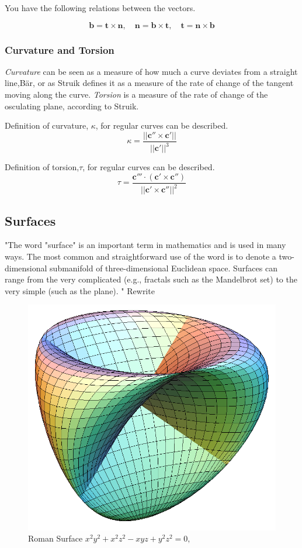 You have the following relations between the vectors.

\begin{equation}
\textbf{b} = \textbf{t} \times \textbf{n} ,\quad \textbf{n} = \textbf{b} \times \textbf{t} ,\quad \textbf{t} = \textbf{n} \times \textbf{b} 
\end{equation}

\subsubsection{Curvature and Torsion} \label{curvature}

\textit{Curvature} can be seen as a measure of how much a curve deviates from a straight line,Bär, or as Struik defines it as a measure of the rate of change of the tangent moving along the curve. \textit{Torsion} is a measure of the rate of change of the osculating plane, according to Struik.

\vspace{5mm} %

Definition of curvature, $\kappa$, for regular curves can be described. 
\begin{equation}
\kappa = \frac{|| \textbf{c}'' \times \textbf{c}' ||}{||\textbf{c}'||^3} 
\end{equation}

Definition of torsion,$\tau$, for regular curves can be described. 
\begin{equation}
\tau = \frac{ \textbf{c}''' \cdot(\textbf{c}' \times \textbf{c}'')}{||\textbf{c}' \times \textbf{c}''||^2} 
\end{equation}

\subsection{Surfaces}

"The word "surface" is an important term in mathematics and is used in many ways. The most common and straightforward use of the word is to denote a two-dimensional submanifold of three-dimensional Euclidean space. Surfaces can range from the very complicated (e.g., fractals such as the Mandelbrot set) to the very simple (such as the plane). " Rewrite

\begin{figure}[H]
\centering
\includegraphics[width=0.5\linewidth]{figure/Theory/Romansurface.png}
 
\caption{Roman Surface $ x^2 y^2+x^2 z^2-x y z+y^2 z^2 = 0,$  }
\end{figure}





